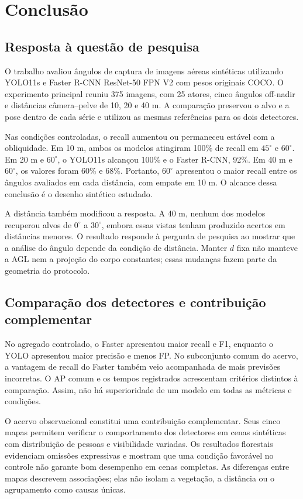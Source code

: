 \chapter{Conclusão}
\section{Resposta à questão de pesquisa}
O trabalho avaliou ângulos de captura de imagens aéreas sintéticas utilizando YOLO11s e Faster R-CNN ResNet-50 FPN V2 com pesos originais COCO. O experimento principal reuniu 375 imagens, com 25 atores, cinco ângulos off-nadir e distâncias câmera--pelve de 10, 20 e 40 m. A comparação preservou o alvo e a pose dentro de cada série e utilizou as mesmas referências para os dois detectores.

Nas condições controladas, o recall aumentou ou permaneceu estável com a obliquidade. Em 10 m, ambos os modelos atingiram 100\% de recall em $45^\circ$ e $60^\circ$. Em 20 m e $60^\circ$, o YOLO11s alcançou 100\% e o Faster R-CNN, 92\%. Em 40 m e $60^\circ$, os valores foram 60\% e 68\%. Portanto, $60^\circ$ apresentou o maior recall entre os ângulos avaliados em cada distância, com empate em 10 m. O alcance dessa conclusão é o desenho sintético estudado.

A distância também modificou a resposta. A 40 m, nenhum dos modelos recuperou alvos de $0^\circ$ a $30^\circ$, embora essas vistas tenham produzido acertos em distâncias menores. O resultado responde à pergunta de pesquisa ao mostrar que a análise do ângulo depende da condição de distância. Manter $d$ fixa não manteve a AGL nem a projeção do corpo constantes; essas mudanças fazem parte da geometria do protocolo.

\section{Comparação dos detectores e contribuição complementar}
No agregado controlado, o Faster apresentou maior recall e F1, enquanto o YOLO apresentou maior precisão e menos FP. No subconjunto comum do acervo, a vantagem de recall do Faster também veio acompanhada de mais previsões incorretas. O AP comum e os tempos registrados acrescentam critérios distintos à comparação. Assim, não há superioridade de um modelo em todas as métricas e condições.

O acervo observacional constitui uma contribuição complementar. Seus cinco mapas permitem verificar o comportamento dos detectores em cenas sintéticas com distribuição de pessoas e visibilidade variadas. Os resultados florestais evidenciam omissões expressivas e mostram que uma condição favorável no controle não garante bom desempenho em cenas completas. As diferenças entre mapas descrevem associações; elas não isolam a vegetação, a distância ou o agrupamento como causas únicas.

